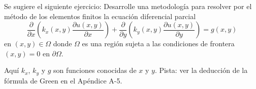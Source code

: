 \documentclass[]{article}
\begin{document}
Se sugiere el siguiente ejercicio:
Desarrolle una metodología para resolver por el método de los elementos finitos la ecuación diferencial parcial
\[
\frac{\partial}{\partial x}\left(k_x(x,y)\frac{\partial u(x,y)}{\partial x}\right) + \frac{\partial}{\partial y}\left(k_y(x,y)\frac{\partial u(x,y)}{\partial y}\right) = g(x,y)
\]
en $(x,y) \in \Omega$ donde $\Omega$ es una región sujeta a las condiciones de frontera $(x,y) = 0$ en $\partial \Omega$.

Aquí $k_x$, $k_y$ y $g$ son funciones conocidas de $x$ y $y$. Pista: ver la deducción de la fórmula de Green en el Apéndice A-5.
\end{document}
